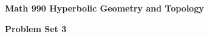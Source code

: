 \documentclass[12pt]{article}
\begin{document}
\def\ctln{\centerline}
\def\msk{\medskip}
\def\bsk{\bigskip}
\def\ssk{\smallskip}
\def\hsk{\hskip.3in}
\def\ra{\rightarrow}
\def\ubr{\underbar}

\def\mt{{\mathcal T}}
\def\mb{{\mathcal B}}
\def\ms{{\mathcal S}}
\def\mu{{\mathcal U}}
\def\mv{{\mathcal V}}

\def\bbc{{\mathbb C}}
\def\bbd{{\mathbb D}}
\def\bbh{{\mathbb H}}
\def\bbr{{\mathbb R}}
\def\bbz{{\mathbb Z}}
\def\bbq{{\mathbb Q}}
\def\bbn{{\mathbb N}}
\def\spc{$~$\hskip.15in$~$}

\def\sset{\subseteq}
\def\del{\partial}
\def\lra{$\Leftrightarrow$}
\def\bra{$\Rightarrow$}
\def\dsp{\displaystyle}

\def\ddr{d_{\bbr^2_+}}
\def\ddd{d_{\bbd^2}}


\ctln{\bf Math 990 Hyperbolic Geometry and Topology}

\ctln{\bf Problem Set 3}

\end{document}
